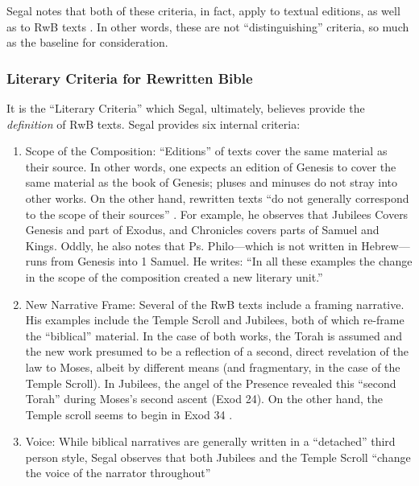 Segal notes that both of these criteria, in fact, apply to textual
editions, as well as to RwB texts \autocite[20]{segal_henze2005}. In
other words, these are not ``distinguishing'' criteria, so much as the
baseline for consideration.

\hypertarget{literary-criteria-for-rwb}{%
\subsubsection{Literary Criteria for
Rewritten Bible}\label{literary-criteria-for-rwb}}

It is the ``Literary Criteria'' which Segal, ultimately, believes
provide the \emph{definition} of RwB
texts.\autocite[20]{segal_henze2005} Segal provides six internal
criteria:

\begin{enumerate}
\def\labelenumi{\arabic{enumi}.}
\item
  Scope of the Composition: ``Editions'' of texts cover the same
  material as their source. In other words, one expects an edition of
  Genesis to cover the same material as the book of Genesis; pluses and
  minuses do not stray into other works. On the other hand, rewritten
  texts ``do not generally correspond to the scope of their sources''
  \autocite[20]{segal_henze2005}. For example, he observes that Jubilees
  Covers Genesis and part of Exodus, and Chronicles covers parts of
  Samuel and Kings. Oddly, he also notes that Ps. Philo---which is not
  written in Hebrew---runs from Genesis into 1 Samuel. He writes: ``In
  all these examples the change in the scope of the composition created
  a new literary unit.'' \autocite[20--21]{segal_henze2005}
\item
  New Narrative Frame: Several of the RwB texts include a framing
  narrative. His examples include the Temple Scroll and Jubilees, both
  of which re-frame the ``biblical'' material. In the case of both
  works, the Torah is assumed and the new work presumed to be a
  reflection of a second, direct revelation of the law to Moses, albeit
  by different means (and fragmentary, in the case of the
  Temple Scroll). In Jubilees, the angel of the Presence revealed this
  ``second Torah'' during Moses's second ascent (Exod 24). On the other
  hand, the Temple scroll seems to begin in Exod 34
  \autocite[22]{segal_henze2005}.
\item
  Voice: While biblical narratives are generally written in a
  ``detached'' third person style, Segal observes that both Jubilees and
  the Temple Scroll ``change the voice of the narrator throughout''

\end{enumerate}
